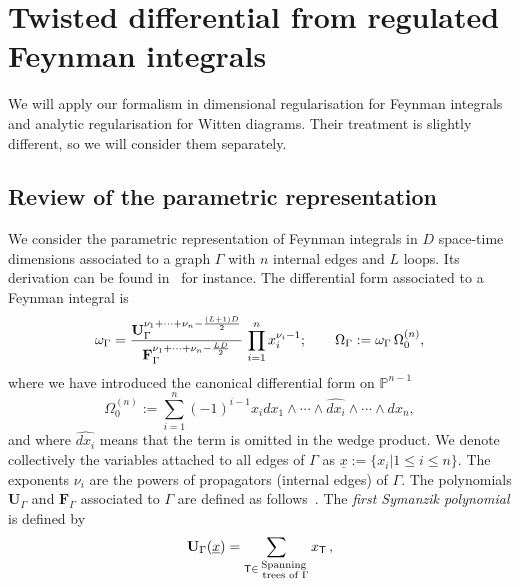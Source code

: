 \documentclass[a4paper,12pt]{article}
\numberwithin{equation}{section}
\numberwithin{figure}{section}
\begin{document}
\section{Twisted differential from regulated Feynman integrals}
\label{sec:parametric}

We will apply our formalism in dimensional regularisation for Feynman integrals and analytic regularisation for Witten diagrams. Their treatment is slightly different, so we will consider them separately. 

\subsection{Review of the parametric representation}
We consider the parametric  representation of Feynman
integrals  in $D$ space-time dimensions associated to a graph $\Gamma$ with $n$   internal edges and $L$ loops. Its derivation can be found  in~\cite{nakanishi1971graph,Vanhove:2014wqa,Bogner:2010kv,Weinzierl:2022eaz} for instance. 
%
The differential form associated to a Feynman integral is 
\begin{equation}\label{e:OmegaDef}
	\omega_\Gamma ={ \textbf{U}_\Gamma ^{\nu_1+\cdots+\nu_n-{(L+1)D\over2}}  \over
  \textbf{F}_\Gamma ^{\nu_1+\cdots+\nu_n-{LD\over2}} }\, \prod_{i=1}^n
x_i^{\nu_i-1}; \qquad 	\Omega_\Gamma :=	\omega_\Gamma \, \Omega^{(n)}_0,
\end{equation}
where we have introduced the  canonical differential form on
$\mathbb P^{n-1}$ 
% 
\begin{equation}
	\Omega_0^{(n)}:=  \sum_{i=1}^n (-1)^{i-1} x_i dx_1\wedge \cdots \wedge \widehat{dx_i} \wedge\cdots \wedge dx_n ,
\end{equation}
and where  $\widehat{dx_i}$ means that the term is omitted in the wedge
product. We denote collectively the 
variables 
attached to all edges of
$\Gamma$ as $\underline x:=\{x_i |1\leq i\leq n\}$. The exponents $\nu_i$ are the powers of propagators (internal edges) of $\Gamma$. 
%
The polynomials $\textbf{U}_\Gamma$ and $\textbf{F}_\Gamma$
associated to  $\Gamma$ are defined as
follows~\cite{nakanishi1971graph,Bogner:2010kv,Weinzierl:2022eaz}.  The {\em first
	Symanzik polynomial} is defined by
\begin{equation}\label{e:Udef}
	{\bf U}_\Gamma (\underline x)= \sum_{\mathsf{T} \in \substack{ \text{Spanning} \\ \text{ trees of } \Gamma}} x_{\mathsf{T}}\,, 
\end{equation}
\end{document}
